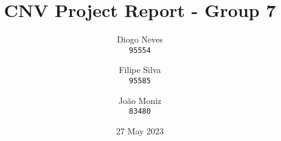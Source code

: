 \documentclass{article}
\date{27 May 2023}
\title{CNV Project Report - Group 7}
\author{
    Diogo Neves \\
    \texttt{95554}
    \and
    Filipe Silva \\
    \texttt{95585}
    \and
    João Moniz \\
    \texttt{83480}
}
\begin{document}
\twocolumn

\maketitle

\lipsum
\end{document}
